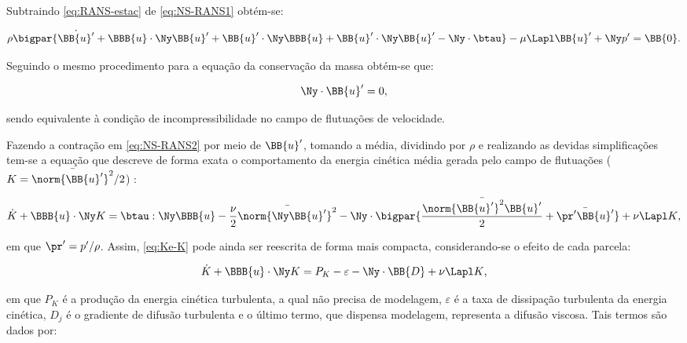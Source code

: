 Subtraindo \eqref{eq:RANS-estac} de \eqref{eq:NS-RANS1} obtém-se:

\begin{equation}
    \rho\bigpar{\dot{\BB{u}'}+\BBB{u}\cdot\Ny\BB{u}'+\BB{u}'\cdot\Ny\BBB{u}+\BB{u}'\cdot\Ny\BB{u}'-\Ny\cdot\btau}-\mu\Lapl\BB{u}'+\Ny p'=\BB{0}\text{.}
    \label{eq:NS-RANS2}
\end{equation}

Seguindo o mesmo procedimento para a equação da conservação da massa obtém-se que:

\begin{equation}
    \Ny\cdot\BB{u}'=0\text{,}
\end{equation}

\noindent sendo equivalente à condição de incompressibilidade no campo de flutuações de velocidade.

Fazendo a contração em \eqref{eq:NS-RANS2} por meio de $\BB{u}'$, tomando a média, dividindo por $\rho$ e realizando as devidas simplificações tem-se a equação que descreve de forma exata o comportamento da energia cinética média gerada pelo campo de flutuações ($K=\bar{\norm{\BB{u}'}^2}/2$) \cite{alfonsi2009reynolds}:


\begin{equation}
    \dot{K}+\BBB{u}\cdot\Ny K=\btau:\Ny\BBB{u}-\frac{\nu}{2}\bar{\norm{\Ny\BB{u}'}^2}-\Ny\cdot\bigpar{\frac{\bar{\norm{\BB{u}'}^2\BB{u}'}}{2}+\bar{\pr'\BB{u}'}}+\nu\Lapl K\text{,}
    \label{eq:Ke-K}
\end{equation}

\noindent em que $\pr'=p'/\rho$. Assim, \eqref{eq:Ke-K} pode ainda ser reescrita de forma mais compacta, considerando-se o efeito de cada parcela:

\begin{equation}
    \dot{K}+\BBB{u}\cdot\Ny K=P_K-\varepsilon-\Ny\cdot\BB{D}+\nu\Lapl K\text{,}
\end{equation}

\noindent em que $P_K$ é a produção da energia cinética turbulenta, a qual não precisa de modelagem, $\varepsilon$ é a taxa de dissipação turbulenta da energia cinética, $D_j$ é o gradiente de difusão turbulenta e o último termo, que dispensa modelagem, representa a difusão viscosa. Tais termos são dados por:

